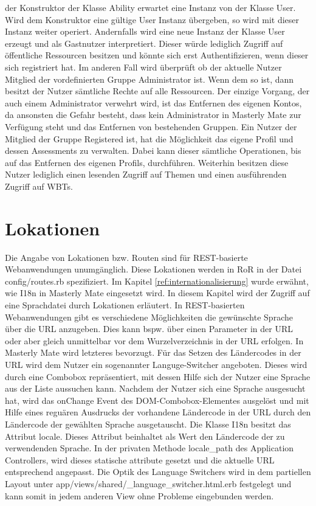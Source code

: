 der Konstruktor der Klasse Ability erwartet eine Instanz von der Klasse
User. Wird dem Konstruktor eine gültige User Instanz übergeben, so wird
mit dieser Instanz weiter operiert. Andernfalls wird eine neue Instanz der
Klasse User erzeugt und als Gastnutzer interpretiert. Dieser würde lediglich
Zugriff auf öffentliche Ressourcen besitzen und könnte sich erst
Authentifizieren, wenn dieser sich registriert hat. Im anderen Fall wird
überprüft ob der aktuelle Nutzer Mitglied der vordefinierten Gruppe
Administrator ist. Wenn dem so ist, dann besitzt der Nutzer sämtliche Rechte auf
alle Ressourcen. Der einzige Vorgang, der auch einem Administrator verwehrt
wird, ist das Entfernen des eigenen Kontos, da ansonsten die Gefahr
besteht, dass kein Administrator in Masterly Mate zur Verfügung steht und das
Entfernen von bestehenden Gruppen. Ein Nutzer der Mitglied der Gruppe Registered
ist, hat die Möglichkeit das eigene Profil und dessen Assessments zu verwalten.
Dabei kann dieser sämtliche Operationen, bis auf das Entfernen des eigenen Profils,
durchführen. Weiterhin besitzen diese Nutzer lediglich einen lesenden Zugriff
auf Themen und einen ausführenden Zugriff auf WBTs. 

\section{Lokationen}
Die Angabe von Lokationen bzw. Routen sind für REST-basierte Webanwendungen
unumgänglich. Diese Lokationen werden in RoR in der Datei 
config/routes.rb spezifiziert. Im Kapitel \ref{ref:internationalisierung}
wurde erwähnt, wie I18n in Masterly Mate eingesetzt wird. In diesem Kapitel wird der
Zugriff auf eine Sprachdatei durch Lokationen erläutert. In REST-basierten
Webanwendungen gibt es verschiedene Möglichkeiten die gewünschte Sprache über
die URL anzugeben. Dies kann bspw. über einen Parameter in der URL oder
aber gleich unmittelbar vor dem Wurzelverzeichnis in der URL erfolgen. In
Masterly Mate wird letzteres bevorzugt. Für das Setzen des Ländercodes in der
URL wird dem Nutzer ein sogenannter Languge-Switcher angeboten. Dieses wird
durch eine Combobox repräsentiert, mit dessen Hilfe sich der Nutzer eine Sprache
aus der Liste aussuchen kann. Nachdem der Nutzer sich eine Sprache ausgesucht
hat, wird das onChange Event des DOM-Combobox-Elementes ausgelöst und mit Hilfe
eines reguären Ausdrucks der vorhandene Ländercode in der URL durch den
Ländercode der gewählten Sprache ausgetauscht. Die Klasse I18n besitzt das
Attribut locale. Dieses Attribut beinhaltet als Wert den Ländercode der zu
verwendenden Sprache. In der privaten Methode locale\_path des Application
Controllers, wird dieses statische attribute gesetzt und die aktuelle URL
entsprechend angepasst. Die Optik des Language Switchers wird in dem partiellen
Layout unter app/views/shared/\_language\_switcher.html.erb festgelegt und kann
somit in jedem anderen View ohne Probleme eingebunden werden.

